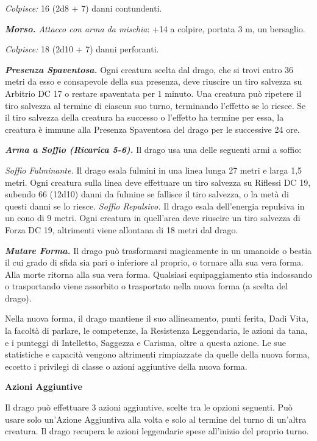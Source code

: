 \begin{multicols}{2}
\emph{Colpisce:} 16 (2d8 + 7) danni contundenti.

\emph{\textbf{Morso.} Attacco con arma da mischia}: +14 a colpire,
portata 3 m, un bersaglio.

\emph{Colpisce:} 18 (2d10 + 7) danni perforanti.

\emph{\textbf{Presenza Spaventosa.}} Ogni creatura scelta dal drago, che
si trovi entro 36 metri da esso e consapevole della sua presenza, deve
riuscire un tiro salvezza su Arbitrio DC 17 o restare spaventata per 1
minuto. Una creatura può ripetere il tiro salvezza al termine di ciascun
suo turno, terminando l'effetto se lo riesce. Se il tiro salvezza della
creatura ha successo o l'effetto ha termine per essa, la creatura è
immune alla Presenza Spaventosa del drago per le successive 24 ore.

\emph{\textbf{Arma a Soffio (Ricarica 5-6).}} Il drago usa una delle
seguenti armi a soffio:

\emph{Soffio Fulminante.} Il drago esala fulmini in una linea lunga 27
metri e larga 1,5 metri. Ogni creatura sulla linea deve effettuare un
tiro salvezza su Riflessi DC 19, subendo 66 (12d10) danni da fulmine se
fallisce il tiro salvezza, o la metà di questi danni se lo riesce.
\emph{Soffio Repulsivo.} Il drago esala dell'energia repulsiva in un
cono di 9 metri. Ogni creatura in quell'area deve riuscire un tiro
salvezza di Forza DC 19, altrimenti viene allontana di 18 metri dal
drago.

\emph{\textbf{Mutare Forma.}} Il drago può trasformarsi magicamente in
un umanoide o bestia il cui grado di sfida sia pari o inferiore al
proprio, o tornare alla sua vera forma. Alla morte ritorna alla sua vera
forma. Qualsiasi equipaggiamento stia indossando o trasportando viene
assorbito o trasportato nella nuova forma (a scelta del drago).

Nella nuova forma, il drago mantiene il suo allineamento, punti ferita,
Dadi Vita, la facoltà di parlare, le competenze, la Resistenza
Leggendaria, le azioni da tana, e i punteggi di Intelletto, Saggezza e
Carisma, oltre a questa azione. Le sue statistiche e capacità vengono
altrimenti rimpiazzate da quelle della nuova forma, eccetto i privilegi
di classe o azioni aggiuntive della nuova forma.

\textbf{Azioni Aggiuntive}

Il drago può effettuare 3 azioni aggiuntive, scelte tra le opzioni
seguenti. Può usare solo un'Azione Aggiuntiva alla volta e solo al
termine del turno di un'altra creatura. Il drago recupera le azioni
leggendarie spese all'inizio del proprio turno.


\end{multicols}
